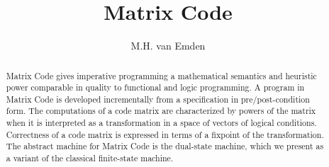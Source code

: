 \documentclass[preprint,11pt]{elsarticle}
\begin{document}
\title{Matrix Code}

\author{M.H. van Emden}

\maketitle
\begin{abstract}
Matrix Code gives imperative programming a mathematical semantics
and heuristic power comparable in quality to functional and logic
programming.  A program in Matrix Code is developed incrementally
from a specification in pre/post-condition form.  The computations
of a code matrix are characterized by powers of the matrix when it
is interpreted as a transformation in a space of vectors of logical
conditions.  Correctness of a code matrix is expressed in terms of
a fixpoint of the transformation.  The abstract machine for Matrix
Code is the dual-state machine, which we present as a variant of
the classical finite-state machine.

\end{abstract}


\newtheorem{theorem}{Theorem}{}
\newtheorem{definition}{Definition}{}
\newtheorem{lemma}{Lemma}{}

\newcommand{\emln}{\\} \newcommand{\lmnt}[1]{\parbox{1.0in}{
   {\footnotesize {\emln \tt #1 }} \emln}}
\newcommand{\lmntWdth}[2]{\parbox{#1in}{
   {\footnotesize {\emln \tt #2 }} \emln}}
\newcommand{\nc}[1]{\lmntWdth{0.5}{#1}} \newcommand{\emp}{\lmnt{}} 

\newcommand{\set}[2]{\{#1 \mid #2\}}
\newcommand{\bk}[3]
  {{\tt \{#1\}#2\{#3\}}}
\newcommand{\brr}[2]{{\tt \{#1\}#2}}
\newcommand{\ktt}[2]{#1\{#2\}}

\newcommand{\vc}[3]{}
\newcommand{\trpl}[3]{{\tt \{#1\}#2\{#3\}}}
\newcommand{\mpr}[2]{{\tt #1:#2}} \newcommand{\mst}[2]{{\tt (#1,#2)}} 

\newcommand{\pr}[2]{\ensuremath{\langle #1,#2 \rangle}}

\newcommand{\ccc}{{\tt C}}
\newcommand{\cpp}{{\tt C++}}

\newcommand{\mc}[1]{\mathcal{#1}}
\end{document}
